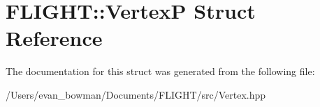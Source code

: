 \hypertarget{struct_f_l_i_g_h_t_1_1_vertex_p}{}\section{F\+L\+I\+G\+HT\+:\+:VertexP Struct Reference}
\label{struct_f_l_i_g_h_t_1_1_vertex_p}


The documentation for this struct was generated from the following file\+:\begin{DoxyCompactItemize}
\item 
/\+Users/evan\+\_\+bowman/\+Documents/\+F\+L\+I\+G\+H\+T/src/Vertex.\+hpp\end{DoxyCompactItemize}
